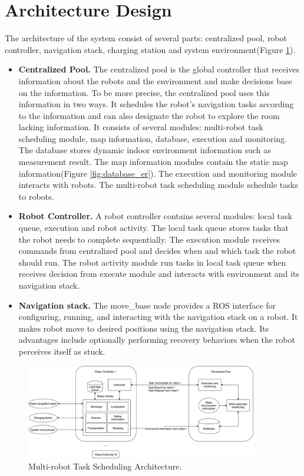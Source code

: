 \section{Architecture Design}
\label{sec:architecture_design}

The architecture of the system consist of several parts: centralized pool, robot controller, navigation stack, charging station and system environment(Figure \ref{fig:system_architecture}). 

\begin{itemize}
	\item \textbf{Centralized Pool.}  The centralized pool is the global controller that receives information about the robots and the environment and make decisions base on the information. To be more precise, the centralized pool uses this information in two ways. It schedules the robot's navigation tasks according to the information and can also designate the robot to explore the room lacking information. It consists of several modules: multi-robot task scheduling module, map information, database, execution and monitoring. The database stores dynamic indoor environment information such as measurement result. The map information modules contain the static map information(Figure \ref{fig:database_er}). The execution and monitoring module interacts with robots. The multi-robot task scheduling module schedule tasks to robots.
	\item \textbf{Robot Controller.} A robot controller contains several modules: local task queue, execution and robot activity. The local task queue stores tasks that the robot needs to complete sequentially. The execution module receives commands from centralized pool and decides when and which task the robot should run. The robot activity module run tasks in local task queue when receives decision from execute module and interacts with environment and its navigation stack.
	\item \textbf{Navigation stack.} The move\_base node provides a ROS interface for configuring, running, and interacting with the navigation stack on a robot. It makes robot move to desired positions using the navigation stack. Its advantages include optionally performing recovery behaviors when the robot perceives itself as stuck\cite{MOVEBASE}. 
\end{itemize} 

\begin{figure}[htbp]
	\centering
	\includegraphics[width = 0.9\textwidth]{content/images/ch3/architecture.drawio.png}
	\caption{Multi-robot Task Scheduling Architecture.}
	\label{fig:system_architecture}
\end{figure}

